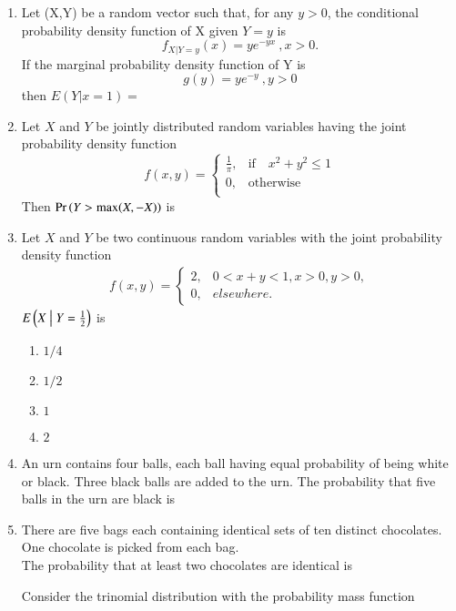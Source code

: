 \documentclass[journal,12pt,twocolumn]{IEEEtran}
\begin{document}
\begin{enumerate}
\solution

%
\item Let (X,Y) be a random vector such that, for any $y>0$, the conditional probability density function of X given $Y=y$ is $$f_{X|Y=y}(x)=ye^{-yx} \:,x>0. $$ If the marginal probability density function of Y is $$g(y)=ye^{-y}\:,y>0$$ then $E(Y|x=1)=$
\\
\solution

%
\item Let $X$ and $Y$ be jointly distributed random
variables having the joint probability
density function
\[
f(x,y) = \begin{cases}
            \frac{1}{\pi}, &\text{if}\quad x^2 + y^2 \leq 1\\
             0, &\text{otherwise}\\
            \end{cases}
\]
Then $\Pr\left(Y > \text{max}(X,-X)\right)$ is
\\
\solution 

%
\item Let $X$ and $Y$ be two continuous random variables with the joint probability density function
\begin{align}
    f(x,y) =
    \begin{cases}
    2, & 0<x+y<1, x>0, y>0,\\
    0, & elsewhere.
    \end{cases}
\end{align}
$E\left(X \bigm| Y=\frac{1}{2}\right)$ is
\begin{enumerate}
    \item $1/4$
    \item $1/2$
    \item $1$
    \item $2$
\end{enumerate}
\solution

%
\item An urn contains four balls, each ball having equal probability of being white or black. Three black balls are added to the urn. The probability that five balls in the urn are black is
\\
\solution

%
\item There are five bags each containing identical sets of ten distinct chocolates. One chocolate is picked from each bag.\\
The probability that at least two chocolates are identical is
%
\\
\solution

%
Consider the trinomial distribution with the probability mass function 

\end{enumerate}
\end{document}
